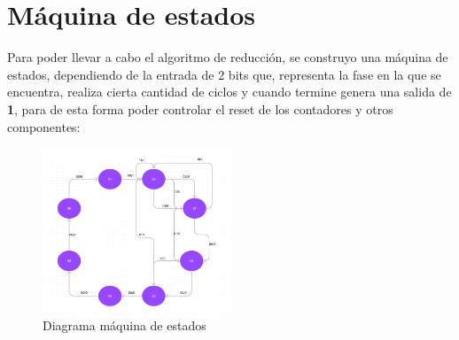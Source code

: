 \documentclass{article}
\begin{document}
\section{Máquina de estados}
Para poder llevar a cabo el algoritmo de reducción, se construyo una máquina de estados, dependiendo de la 
entrada de 2 bits que, representa la fase en la que se encuentra, realiza cierta cantidad de ciclos y cuando 
termine genera una salida de \textbf{1}, para de esta forma poder controlar el reset de los contadores y otros 
componentes:
\begin{figure}[h] %
    \centering
    \includegraphics[width=0.5\textwidth]{imagenes/diagrama_maquina_estados.png} %
    \caption{Diagrama máquina de estados} %
    \label{fig:diagramaestados} %
\end{figure}
\newpage
\end{document}
